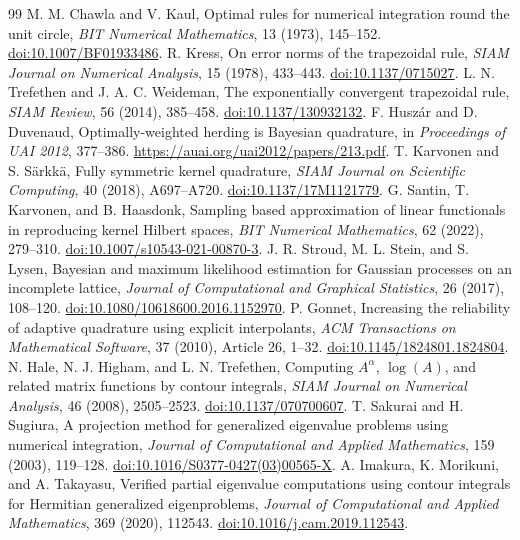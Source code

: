 \documentclass[11pt]{article}
\begin{document}
\begin{thebibliography}{99}
 M. M. Chawla and V. Kaul, Optimal rules for numerical integration round the unit circle, \emph{BIT Numerical Mathematics}, 13 (1973), 145--152. \href{https://doi.org/10.1007/BF01933486}{doi:10.1007/BF01933486}.
 R. Kress, On error norms of the trapezoidal rule, \emph{SIAM Journal on Numerical Analysis}, 15 (1978), 433--443. \href{https://doi.org/10.1137/0715027}{doi:10.1137/0715027}.
 L. N. Trefethen and J. A. C. Weideman, The exponentially convergent trapezoidal rule, \emph{SIAM Review}, 56 (2014), 385--458. \href{https://doi.org/10.1137/130932132}{doi:10.1137/130932132}.
 F. Husz\'ar and D. Duvenaud, Optimally-weighted herding is Bayesian quadrature, in \emph{Proceedings of UAI 2012}, 377--386. \url{https://auai.org/uai2012/papers/213.pdf}.
 T. Karvonen and S. S\"arkk\"a, Fully symmetric kernel quadrature, \emph{SIAM Journal on Scientific Computing}, 40 (2018), A697--A720. \href{https://doi.org/10.1137/17M1121779}{doi:10.1137/17M1121779}.
 G. Santin, T. Karvonen, and B. Haasdonk, Sampling based approximation of linear functionals in reproducing kernel Hilbert spaces, \emph{BIT Numerical Mathematics}, 62 (2022), 279--310. \href{https://doi.org/10.1007/s10543-021-00870-3}{doi:10.1007/s10543-021-00870-3}.
 J. R. Stroud, M. L. Stein, and S. Lysen, Bayesian and maximum likelihood estimation for Gaussian processes on an incomplete lattice, \emph{Journal of Computational and Graphical Statistics}, 26 (2017), 108--120. \href{https://doi.org/10.1080/10618600.2016.1152970}{doi:10.1080/10618600.2016.1152970}.
 P. Gonnet, Increasing the reliability of adaptive quadrature using explicit interpolants, \emph{ACM Transactions on Mathematical Software}, 37 (2010), Article 26, 1--32. \href{https://doi.org/10.1145/1824801.1824804}{doi:10.1145/1824801.1824804}.
 N. Hale, N. J. Higham, and L. N. Trefethen, Computing $A^\alpha$, $\log(A)$, and related matrix functions by contour integrals, \emph{SIAM Journal on Numerical Analysis}, 46 (2008), 2505--2523. \href{https://doi.org/10.1137/070700607}{doi:10.1137/070700607}.
 T. Sakurai and H. Sugiura, A projection method for generalized eigenvalue problems using numerical integration, \emph{Journal of Computational and Applied Mathematics}, 159 (2003), 119--128. \href{https://doi.org/10.1016/S0377-0427(03)00565-X}{doi:10.1016/S0377-0427(03)00565-X}.
 A. Imakura, K. Morikuni, and A. Takayasu, Verified partial eigenvalue computations using contour integrals for Hermitian generalized eigenproblems, \emph{Journal of Computational and Applied Mathematics}, 369 (2020), 112543. \href{https://doi.org/10.1016/j.cam.2019.112543}{doi:10.1016/j.cam.2019.112543}.
\end{thebibliography}
\end{document}
